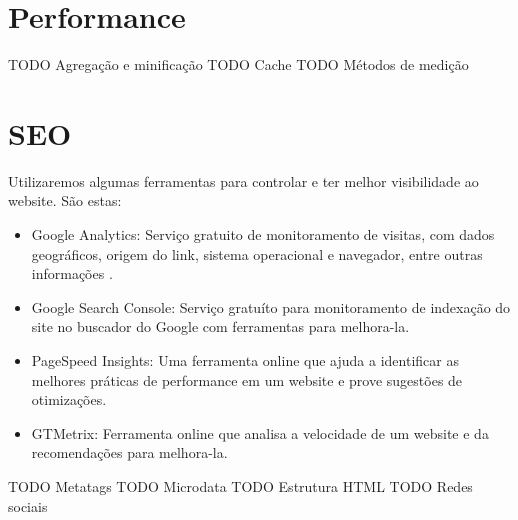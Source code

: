 \section{Performance}

TODO Agregação e minificação
TODO Cache
TODO Métodos de medição

\section{SEO}

Utilizaremos algumas ferramentas para controlar e ter melhor visibilidade ao website. São estas:

\begin{itemize}
  \item Google Analytics: Serviço gratuito de monitoramento de visitas, com dados geográficos, origem do link, sistema operacional e navegador, entre outras informações \cite{Analytics}.
  \item Google Search Console: Serviço gratuíto para monitoramento de indexação do site no buscador do Google com ferramentas para melhora-la. 
  \item PageSpeed Insights: Uma ferramenta online que ajuda a identificar as melhores práticas de performance em um website e prove sugestões de otimizações.
  \item GTMetrix: Ferramenta online que analisa a velocidade de um website e da recomendações para melhora-la.
\end{itemize}

TODO Metatags
TODO Microdata
TODO Estrutura HTML
TODO Redes sociais

